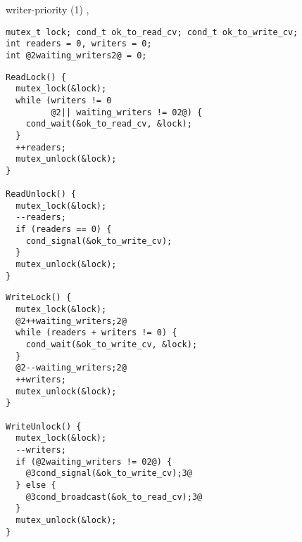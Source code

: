 
\begin{frame}[fragile,label=writerPriority]{writer-priority (1)}
,
\begin{lstlisting}
mutex_t lock; cond_t ok_to_read_cv; cond_t ok_to_write_cv;
int readers = 0, writers = 0;
int @2waiting_writers2@ = 0;
\end{lstlisting}
\begin{minipage}{0.45\textwidth}
\begin{lstlisting}
ReadLock() {
  mutex_lock(&lock);
  while (writers != 0
         @2|| waiting_writers != 02@) {
    cond_wait(&ok_to_read_cv, &lock);
  }
  ++readers;
  mutex_unlock(&lock);
}

ReadUnlock() {
  mutex_lock(&lock);
  --readers;
  if (readers == 0) {
    cond_signal(&ok_to_write_cv);
  }
  mutex_unlock(&lock);
}
\end{lstlisting}
\end{minipage}
\begin{minipage}{0.45\textwidth}
\begin{lstlisting}
WriteLock() {
  mutex_lock(&lock);
  @2++waiting_writers;2@
  while (readers + writers != 0) {
    cond_wait(&ok_to_write_cv, &lock);
  }
  @2--waiting_writers;2@
  ++writers;
  mutex_unlock(&lock);
}

WriteUnlock() {
  mutex_lock(&lock);
  --writers;
  if (@2waiting_writers != 02@) {
    @3cond_signal(&ok_to_write_cv);3@
  } else {
    @3cond_broadcast(&ok_to_read_cv);3@
  }
  mutex_unlock(&lock);
}
\end{lstlisting}
\end{minipage}
\end{frame}

